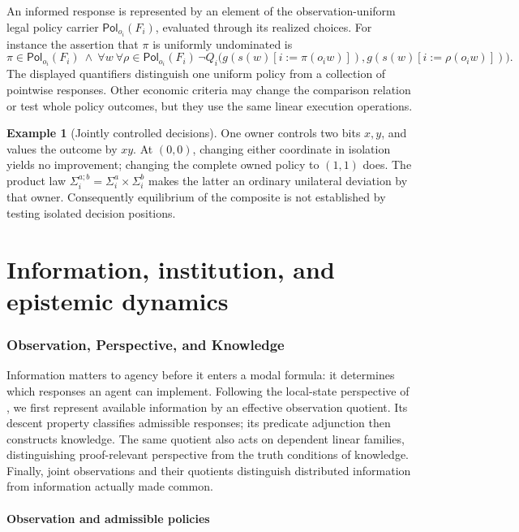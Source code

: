 \documentclass[11pt,a4paper]{article}
\numberwithin{equation}{section}
\theoremstyle{definition}
\newtheorem{example}[theorem]{Example}
\theoremstyle{remark}
\theoremstyle{plain}
\providecommand{\Pol}{\mathsf{Pol}}
\providecommand{\seq}{\mathbin{;}}
\begin{document}
An informed response is represented by an element of the observation-uniform legal policy carrier $\Pol_{o_i}(F_i)$, evaluated through its realized choices. For instance the assertion that $\pi$ is uniformly undominated is
\[
 \pi\in\Pol_{o_i}(F_i)\ \wedge\
 \forall w\ \forall\rho\in\Pol_{o_i}(F_i)\,
 \neg Q_i\bigl(g(s(w)[i:=\pi(o_iw)]),
                g(s(w)[i:=\rho(o_iw)])\bigr).
\]
The displayed quantifiers distinguish one uniform policy from a
collection of pointwise responses. Other economic criteria may change
the comparison relation or test whole policy outcomes, but they use the
same linear execution operations.

\begin{example}[Jointly controlled decisions]
One owner controls two bits $x,y$, and values the outcome by $xy$.
At $(0,0)$, changing either coordinate in isolation yields no improvement;
changing the complete owned policy to $(1,1)$ does. The product law
$\Sigma_i^{a\seq b}=\Sigma_i^a\times\Sigma_i^b$ makes the latter an
ordinary unilateral deviation by that owner. Consequently equilibrium of
the composite is not established by testing isolated decision positions.
\end{example}

\part{Information, institution, and epistemic dynamics}

\section{Observation, Perspective, and Knowledge}\label{sec:paper-6}

Information matters to agency before it enters a modal formula:
it determines which responses an agent can implement. Following the
local-state perspective of \citet{HalpernFagin1989KnowledgeAction},
we first represent available information by an effective observation
quotient. Its descent property classifies admissible responses; its
predicate adjunction then constructs knowledge. The same quotient also
acts on dependent linear families, distinguishing proof-relevant
perspective from the truth conditions of knowledge. Finally, joint
observations and their quotients distinguish distributed information
from information actually made common.

\subsection{Observation and admissible policies}
\label{sec:egt-information}
\end{document}
